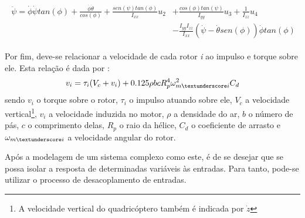\begin{align}
\begin{split}
\ddot{\psi} = \dot{\phi}\dot{\psi}tan(\phi) +
\frac{\dot{\phi}\dot{\theta}}{cos(\phi)} + 
\frac{sen(\psi)tan(\phi)}{I_{xx}}u_2 &+ 
\frac{cos(\phi)tan(\psi)}{I_{yy}}u_3 + 
\frac{1}{I_{zz}}u_4 \\
&-\frac{I_{yy}I_{zz}}{I_{xx}} 
(\dot{\psi}-\dot{\theta}sen(\phi))\dot{\phi}tan(\phi)
\end{split}
\end{align}

Por fim, deve-se relacionar a velocidade de cada rotor \textit{i} ao impulso e torque sobre ele. Esta relação é dada por \cite[p.~7]{Balas2007}:
\begin{equation}
v_i = \tau_i(V_c+v_i)+0.125\rho bcR_p^4\omega_{m\textunderscore i}^2C_d
\end{equation}
sendo $v_i$ o torque sobre o rotor, $\tau_i$ o impulso atuando sobre ele, $V_c$ a velocidade vertical\footnote{A velocidade vertical do quadricóptero também é indicada por $\dot{z}$}, $v_i$ a velocidade induzida no motor, $\rho$ a densidade do ar, $b$ o número de pás, $c$ o comprimento delas, $R_p$ o raio da hélice, $C_d$ o coeficiente de arrasto e $\omega_{m\textunderscore i}$ a velocidade angular do rotor.

Após a modelagem de um sistema complexo como este, é de se desejar que se possa isolar a resposta de determinadas variáveis às entradas. Para tanto, pode-se utilizar o processo de desacoplamento de entradas.
